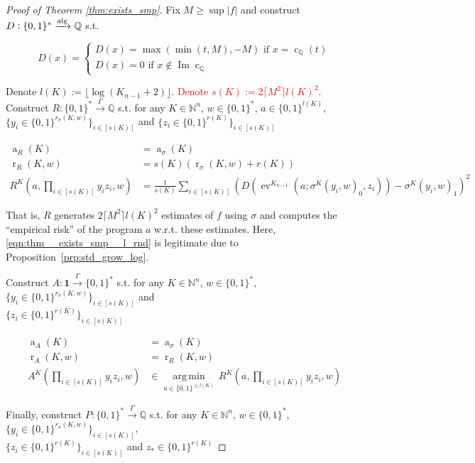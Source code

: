 \documentclass[11pt]{article}
\numberwithin{equation}{section}
\theoremstyle{definition}
\theoremstyle{plain}
\newcommand{\Bool}{\{0,1\}}
\newcommand{\Words}{{\Bool^*}}
\DeclareMathOperator{\Img}{Im}
\DeclareMathOperator{\Ev}{ev}
\DeclareMathOperator{\R}{r}
\DeclareMathOperator{\A}{a}
\DeclareMathOperator{\En}{c}
\newcommand{\Argmin}[1]{\underset{#1}{\operatorname{arg\,min}}\,}
\newcommand{\Nats}{\mathbb{N}}
\newcommand{\Rats}{\mathbb{Q}}
\newcommand{\Abs}[1]{\lvert #1 \rvert}
\newcommand{\Floor}[1]{\lfloor #1 \rfloor}
\newcommand{\Ceil}[1]{\lceil #1 \rceil}
\newcommand{\Alg}{\xrightarrow{\textnormal{alg}}}
\newcommand{\Scheme}{\xrightarrow{\Gamma}}
\begin{document}
\begin{proof}[Proof of Theorem \ref{thm:exists_smp}]

Fix $M \geq \sup \Abs{f}$ and construct ${D: \Words \Alg \Rats}$ s.t.

\[D(x)=\begin{cases}D(x)=\max(\min(t,M),-M) \text{ if ${x = \En_\Rats(t)}$}\\D(x)=0 \text{ if } x \not\in \Img \En_\Rats\end{cases}\]

Denote ${l(K):=\Floor{\log (K_{n-1} + 2)}}$. \textcolor{red}{Denote $s(K):=2\Ceil{M^2}l(K)^2$}. Construct ${R: \Words \Scheme \Rats}$ s.t. for any ${K \in \Nats^n}$, $w \in \Words$, ${a \in \Bool^{l(K)}}$, ${\{y_i \in \Bool^{r_\sigma(K,w)}\}_{i \in [s(K)]}}$ and ${\{z_i \in \Bool^{r(K)}\}_{i \in [s(K)]}}$

\begin{align}
\label{eqn:thm__exists_smp__l_adv}\A_R(K) &= \A_\sigma(K) \\
\label{eqn:thm__exists_smp__l_rnd}\R_R(K,w) &= s(K) (\R_\sigma(K,w) + r(K)) \\
\label{eqn:thm__exists_smp__l_alg}R^K\left(a,\prod_{i \in [s(K)]}y_i z_i,w\right) &= \frac{1}{s(K)}\sum_{i \in [s(K)]}(D(\Ev^{K_{n-1}}(a;\sigma^K(y_i,w)_0,z_i))-\sigma^K(y_i,w)_1)^2 
\end{align}

That is, ${R}$ generates ${2\Ceil{M^2}l(K)^2}$ estimates of ${f}$ using ${\sigma}$ and computes the \enquote{empirical risk} of the program ${a}$ w.r.t. these estimates. Here, \ref{eqn:thm__exists_smp__l_rnd} is legitimate due to Proposition~\ref{prp:std_grow_log}. 

Construct ${A: \bm{1} \Scheme \Words}$ s.t. for any ${K \in \Nats^n}$, ${w \in \Words}$, ${\{y_i \in \Bool^{r_\sigma(K,w)}\}_{i \in [s(K)]}}$ and\\ ${\{z_i \in \Bool^{r(K)}\}_{i \in [s(K)]}}$

\begin{align}
\label{eqn:thm__exists_smp__a_adv}\A_A(K) &= \A_\sigma(K) \\
\label{eqn:thm__exists_smp__a_rnd}\R_A(K,w) &= \R_R(K,w) \\
\label{eqn:thm__exists_smp__a_alg}A^K\left(\prod_{i \in [s(K)]}y_i z_i,w\right) &\in \Argmin{a \in \Bool^{\leq l(K)}} R^K\left(a,\prod_{i \in [s(K)]}y_i z_i,w\right)
\end{align}

Finally, construct ${P: \Words \Scheme \Rats}$ s.t. for any ${K \in \Nats^n}$, ${w \in \Words}$, ${\{y_i \in \Bool^{r_\sigma(K,w)}\}_{i \in [s(K)]}}$,\\ ${\{z_i \in \Bool^{r(K)}\}_{i \in [s(K)]}}$ and ${z_* \in \Bool^{r(K)}}$


\end{proof}
\end{document}
